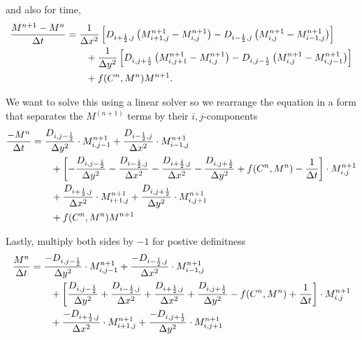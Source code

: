   and also for time,
  \begin{align}
    \frac{M^{n+1} - M^n}{\Delta t} &= \frac{1}{\Delta x ^2} \left[ D_{i+\frac{1}{2},j} \left( M^{n+1}_{i+1,j} - M^{n+1}_{i,j}  \right)  - D_{i-\frac{1}{2},j} \left( M^{n+1}_{i,j} - M^{n+1}_{i-1,j}  \right) \right] \\
    &\qquad + \frac{1}{\Delta y ^2} \left[ D_{i,j+\frac{1}{2}} \left( M^{n+1}_{i,j+1} - M^{n+1}_{i,j}  \right)  - D_{i,j-\frac{1}{2}} \left( M^{n+1}_{i,j} - M^{n+1}_{i,j-1}  \right) \right] \notag \\
    & \qquad + f(C^n,M^n) M^{n+1}.
  \end{align}

  We want to solve this using a linear solver so we rearrange the equation in a form that separates the $M^(n+1)$ terms by their $i,j$-components
  \begin{align}
    \frac{-M^n}{\Delta t} &= \frac{D_{i,j-\frac{1}{2}}}{\Delta y ^2} \cdot M^{n+1}_{i,j-1} + \frac{D_{i-\frac{1}{2},j}}{\Delta x ^2} \cdot M^{n+1}_{i-1,j} \notag \\
    & \qquad +  \left[ -\frac{D_{i,j-\frac{1}{2}}}{\Delta y ^2} - \frac{D_{i-\frac{1}{2},j}}{\Delta x ^2} - \frac{D_{i+\frac{1}{2},j}}{\Delta x ^2} - \frac{D_{i,j+\frac{1}{2}}}{\Delta y ^2} + f(C^n, M^n) - \frac{1}{\Delta t} \right] \cdot M^{n+1}_{i,j} \notag \\
    & \qquad + \frac{D_{i+\frac{1}{2},j}}{\Delta x ^2} \cdot M^{n+1}_{i+1,j} + \frac{D_{i,j+\frac{1}{2}}}{\Delta y ^2} \cdot M^{n+1}_{i,j+1} \notag  \\
        & \qquad + f(C^n,M^n) M^{n+1} \notag \\
  \end{align}
  
  Lastly, multiply both sides by $-1$ for postive definitness
  \begin{align}
    \frac{M^n}{\Delta t} &= \frac{-D_{i,j-\frac{1}{2}}}{\Delta y ^2} \cdot M^{n+1}_{i,j-1} + \frac{-D_{i-\frac{1}{2},j}}{\Delta x ^2} \cdot M^{n+1}_{i-1,j} \notag \\
    & \qquad +  \left[ \frac{D_{i,j-\frac{1}{2}}}{\Delta y ^2} + \frac{D_{i-\frac{1}{2},j}}{\Delta x ^2} + \frac{D_{i+\frac{1}{2},j}}{\Delta x ^2} + \frac{D_{i,j+\frac{1}{2}}}{\Delta y ^2} - f(C^n, M^n) + \frac{1}{\Delta t} \right] \cdot M^{n+1}_{i,j} \notag \\
    & \qquad + \frac{-D_{i+\frac{1}{2},j}}{\Delta x ^2} \cdot M^{n+1}_{i+1,j} + \frac{-D_{i,j+\frac{1}{2}}}{\Delta y ^2} \cdot M^{n+1}_{i,j+1} \notag  
  \end{align}
  
